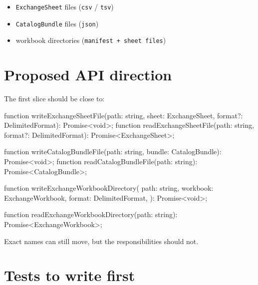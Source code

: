 \begin{itemize}
\tightlist
\item
  \texttt{E\allowbreak{}x\allowbreak{}c\allowbreak{}h\allowbreak{}a\allowbreak{}n\allowbreak{}g\allowbreak{}e\allowbreak{}S\allowbreak{}h\allowbreak{}e\allowbreak{}e\allowbreak{}t} files (\texttt{c\allowbreak{}s\allowbreak{}v} / \texttt{t\allowbreak{}s\allowbreak{}v})
\item
  \texttt{C\allowbreak{}a\allowbreak{}t\allowbreak{}a\allowbreak{}l\allowbreak{}o\allowbreak{}g\allowbreak{}B\allowbreak{}u\allowbreak{}n\allowbreak{}d\allowbreak{}l\allowbreak{}e} files (\texttt{j\allowbreak{}s\allowbreak{}o\allowbreak{}n})
\item
  workbook directories (\texttt{m\allowbreak{}a\allowbreak{}n\allowbreak{}i\allowbreak{}f\allowbreak{}e\allowbreak{}s\allowbreak{}t\allowbreak{} \allowbreak{}+\allowbreak{} \allowbreak{}s\allowbreak{}h\allowbreak{}e\allowbreak{}e\allowbreak{}t\allowbreak{} \allowbreak{}f\allowbreak{}i\allowbreak{}l\allowbreak{}e\allowbreak{}s})
\end{itemize}

\section{Proposed API direction}\label{record-192-proposed-api-direction}

The first slice should be close to:

\begin{CodeBlock}
function writeExchangeSheetFile(path: string, sheet: ExchangeSheet, format?: DelimitedFormat): Promise<void>;
function readExchangeSheetFile(path: string, format?: DelimitedFormat): Promise<ExchangeSheet>;

function writeCatalogBundleFile(path: string, bundle: CatalogBundle): Promise<void>;
function readCatalogBundleFile(path: string): Promise<CatalogBundle>;

function writeExchangeWorkbookDirectory(
  path: string,
  workbook: ExchangeWorkbook,
  format: DelimitedFormat,
): Promise<void>;

function readExchangeWorkbookDirectory(path: string): Promise<ExchangeWorkbook>;
\end{CodeBlock}

Exact names can still move, but the responsibilities should not.

\section{Tests to write first}\label{record-192-tests-to-write-first}

